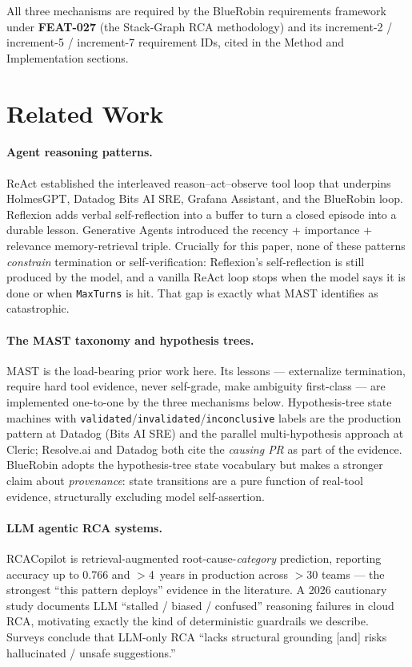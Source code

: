 \documentclass[11pt]{article}
\begin{document}
All three mechanisms are required by the BlueRobin requirements framework
under \textbf{FEAT-027} (the Stack-Graph RCA methodology) and its
increment-2 / increment-5 / increment-7 requirement IDs, cited in the Method
and Implementation sections.

\section{Related Work}

\paragraph{Agent reasoning patterns.}
ReAct \citep{yao2022react} established the interleaved reason--act--observe
tool loop that underpins HolmesGPT, Datadog Bits AI SRE, Grafana Assistant,
and the BlueRobin loop. Reflexion \citep{shinn2023reflexion} adds verbal
self-reflection into a buffer to turn a closed episode into a durable lesson.
Generative Agents \citep{park2023generative} introduced the recency +
importance + relevance memory-retrieval triple. Crucially for this paper, none
of these patterns \emph{constrain} termination or self-verification:
Reflexion's self-reflection is still produced by the model, and a vanilla
ReAct loop stops when the model says it is done or when \texttt{MaxTurns} is
hit. That gap is exactly what MAST identifies as catastrophic.

\paragraph{The MAST taxonomy and hypothesis trees.}
MAST \citep{cemri2025mast} is the load-bearing prior work here. Its lessons
--- externalize termination, require hard tool evidence, never self-grade,
make ambiguity first-class --- are implemented one-to-one by the three
mechanisms below. Hypothesis-tree state machines with
\texttt{validated}/\texttt{invalidated}/\texttt{inconclusive} labels are the
production pattern at Datadog (Bits AI SRE) and the parallel multi-hypothesis
approach at Cleric; Resolve.ai and Datadog both cite the \emph{causing PR} as
part of the evidence. BlueRobin adopts the hypothesis-tree state vocabulary
but makes a stronger claim about \emph{provenance}: state transitions are a
pure function of real-tool evidence, structurally excluding model
self-assertion.

\paragraph{LLM agentic RCA systems.}
RCACopilot \citep{chen2023rcacopilot} is retrieval-augmented
root-cause-\emph{category} prediction, reporting accuracy up to 0.766 and
$>$4~years in production across $>$30 teams --- the strongest ``this pattern
deploys'' evidence in the literature. A 2026 cautionary study
\citep{anon2026cautionary} documents LLM ``stalled / biased / confused''
reasoning failures in cloud RCA, motivating exactly the kind of deterministic
guardrails we describe. Surveys \citep{survey2024rca} conclude that LLM-only
RCA ``lacks structural grounding [and] risks hallucinated / unsafe
suggestions.''
\end{document}
